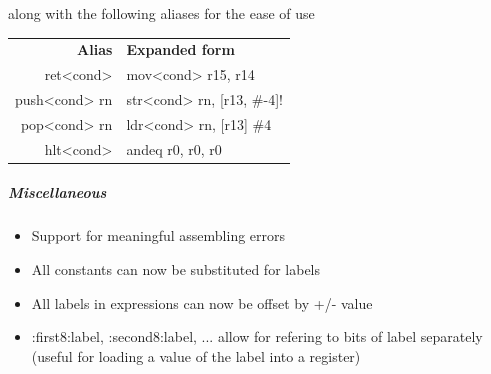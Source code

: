 \documentclass[11pt]{article}
\begin{document}
along with the following aliases for the ease of use
\begin{center}
	\begin{tabular}{r|l}
		\textbf{Alias} & \textbf{Expanded form} \\
		ret<cond> & mov<cond> r15, r14\\
		push<cond> rn & str<cond> rn, [r13, \#-4]!\\
		pop<cond> rn & ldr<cond> rn, [r13] \#4\\
		hlt<cond> & andeq r0, r0, r0
	\end{tabular}
\end{center}
\subparagraph*{Miscellaneous}
\begin{itemize}
\item Support for meaningful assembling errors
\item All constants can now be substituted for labels
\item All labels in expressions can now be offset by +/- value
\item :first8:label, :second8:label, ... allow for refering to bits of label separately (useful for loading a value of the label into a register)
\end{itemize}
\end{document}

